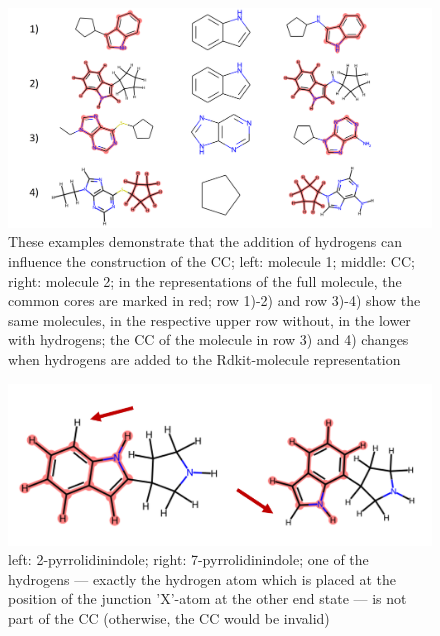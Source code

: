 \begin{figure}
	
	\includegraphics[scale=0.13]{hydrogens_plus_minus_v2.png}
	\caption{These examples demonstrate that the addition of hydrogens can influence the construction of the CC; left: molecule 1; middle: CC; right: molecule 2; in the representations of the full molecule, the common cores are marked in red; row 1)-2) and row 3)-4) show the same molecules, in the respective upper row without,
		in the lower with hydrogens; the CC of the molecule in row 3) and 4)  changes when hydrogens are added to the Rdkit-molecule
		representation}
		\label{fig:hydrogen_effect}
\end{figure}



\begin{figure}
	\includegraphics[scale=1.0]{pyrrolidinindole_v2}
	
	\caption{
		left: 2-pyrrolidinindole; right: 7-pyrrolidinindole; 
		one of the hydrogens --- exactly the hydrogen atom which is placed at the position of the junction 'X'-atom at the other end state --- is not part of the CC (otherwise, the CC would be invalid)}
	\label{fig:pyrrolidinindole}
\end{figure}


